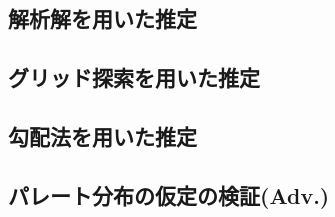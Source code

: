 \documentclass{article}
\begin{document}
\subsection{解析解を用いた推定}

\subsection{グリッド探索を用いた推定}

\subsection{勾配法を用いた推定}

\subsection{パレート分布の仮定の検証(Adv.)}
\end{document}
